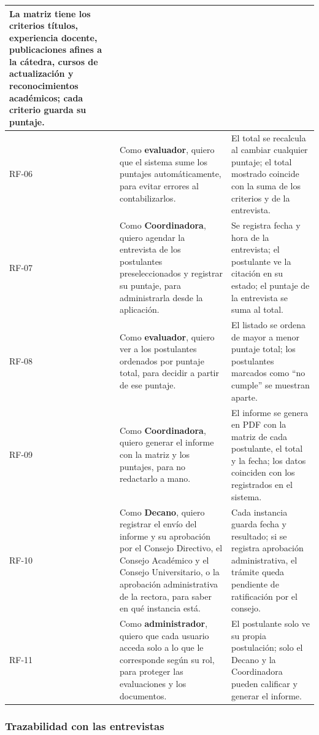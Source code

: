 {\begin{longtable}{@{}p{1.2cm}p{6.3cm}p{7.3cm}@{}}
La matriz tiene los criterios títulos, experiencia docente, publicaciones afines a la cátedra, cursos de actualización y reconocimientos académicos; cada criterio guarda su puntaje. \\
\midrule
RF-06 & Como \textbf{evaluador}, quiero que el sistema sume los puntajes automáticamente, para evitar errores al contabilizarlos. &
El total se recalcula al cambiar cualquier puntaje; el total mostrado coincide con la suma de los criterios y de la entrevista. \\
\midrule
RF-07 & Como \textbf{Coordinadora}, quiero agendar la entrevista de los postulantes preseleccionados y registrar su puntaje, para administrarla desde la aplicación. &
Se registra fecha y hora de la entrevista; el postulante ve la citación en su estado; el puntaje de la entrevista se suma al total. \\
\midrule
RF-08 & Como \textbf{evaluador}, quiero ver a los postulantes ordenados por puntaje total, para decidir a partir de ese puntaje. &
El listado se ordena de mayor a menor puntaje total; los postulantes marcados como \enquote{no cumple} se muestran aparte. \\
\midrule
RF-09 & Como \textbf{Coordinadora}, quiero generar el informe con la matriz y los puntajes, para no redactarlo a mano. &
El informe se genera en PDF con la matriz de cada postulante, el total y la fecha; los datos coinciden con los registrados en el sistema. \\
\midrule
RF-10 & Como \textbf{Decano}, quiero registrar el envío del informe y su aprobación por el Consejo Directivo, el Consejo Académico y el Consejo Universitario, o la aprobación administrativa de la rectora, para saber en qué instancia está. &
Cada instancia guarda fecha y resultado; si se registra aprobación administrativa, el trámite queda pendiente de ratificación por el consejo. \\
\midrule
RF-11 & Como \textbf{administrador}, quiero que cada usuario acceda solo a lo que le corresponde según su rol, para proteger las evaluaciones y los documentos. &
El postulante solo ve su propia postulación; solo el Decano y la Coordinadora pueden calificar y generar el informe. \\
\bottomrule
\end{longtable}
}

\subsubsection{Trazabilidad con las entrevistas}

